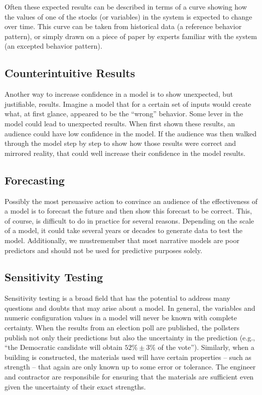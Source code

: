 \documentclass[]{memoir}
\begin{document}
Often these expected results can be described in terms of a curve
showing how the values of one of the stocks (or variables) in the system
is expected to change over time. This curve can be taken from historical
data (a reference behavior pattern), or simply drawn on a piece of paper
by experts familiar with the system (an excepted behavior pattern).

\subsection{Counterintuitive Results}

Another way to increase confidence in a model is to show unexpected, but
justifiable, results. Imagine a model that for a certain set of inputs
would create what, at first glance, appeared to be the ``wrong''
behavior. Some lever in the model could lead to unexpected results. When
first shown these results, an audience could have low confidence in the
model. If the audience was then walked through the model step by step to
show how those results were correct and mirrored reality, that could
well increase their confidence in the model results.

\subsection{Forecasting}

Possibly the most persuasive action to convince an audience of the
effectiveness of a model is to forecast the future and then show this
forecast to be correct. This, of course, is difficult to do in practice
for several reasons. Depending on the scale of a model, it could take
several years or decades to generate data to test the model.
Additionally, we mustremember that most narrative models are poor
predictors and should not be used for predictive purposes solely.

\subsection{Sensitivity Testing}

Sensitivity testing is a broad field that has the potential to address
many questions and doubts that may arise about a model. In general, the
variables and numeric configuration values in a model will never be
known with complete certainty. When the results from an election poll
are published, the pollsters publish not only their predictions but also
the uncertainty in the prediction (e.g., ``the Democratic candidate will
obtain $52\% \pm 3\%$ of the vote''). Similarly, when a building is
constructed, the materials used will have certain properties -- such as
strength -- that again are only known up to some error or tolerance. The
engineer and contractor are responsibile for ensuring that the materials
are sufficient even given the uncertainty of their exact strengths.
\end{document}
